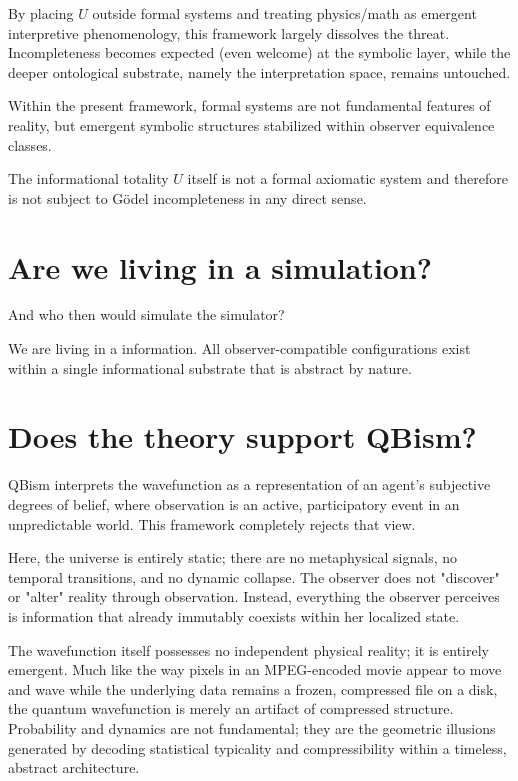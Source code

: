 By placing $U$ outside formal systems and treating physics/math as emergent interpretive phenomenology, this framework largely dissolves the threat.
Incompleteness becomes expected (even welcome) at the symbolic layer, while the deeper ontological substrate, namely the interpretation space, remains untouched.

Within the present framework, formal systems are not fundamental features of reality, but emergent symbolic structures stabilized within observer equivalence classes.

The informational totality \(U\) itself is not a formal axiomatic system and therefore is not subject to Gödel incompleteness in any direct sense.


\section*{Are we living in a simulation?}

And who then would simulate the simulator?

We are living in a information. All observer-compatible configurations exist within a single informational substrate that is abstract by nature.


\section*{Does the theory support QBism?}

QBism interprets the wavefunction as a representation of an agent’s subjective degrees of belief, where observation is an active, participatory event in an unpredictable world. This framework completely rejects that view. 

Here, the universe is entirely static; there are no metaphysical signals, no temporal transitions, and no dynamic collapse.
The observer does not "discover" or "alter" reality through observation.
Instead, everything the observer perceives is information that already immutably coexists within her localized state. 

The wavefunction itself possesses no independent physical reality; it is entirely emergent.
Much like the way pixels in an MPEG-encoded movie appear to move and wave while the underlying data remains a frozen, compressed file on a disk, the quantum wavefunction is merely an artifact of compressed structure.
Probability and dynamics are not fundamental; they are the geometric illusions generated by decoding statistical typicality and compressibility within a timeless, abstract architecture.



